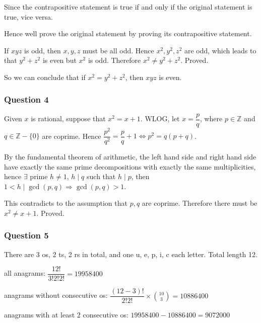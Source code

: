 \documentclass[
]{article}
\begin{document}
Since the contrapositive statement is true if and only if the original
statement is true, vice versa.

Hence we\textquotesingle ll prove the original statement by proving its
contrapositive statement.

If \(xyz\) is odd, then \(x,y,z\) must be all odd. Hence \(x^2,y^2,z^2\)
are odd, which leads to that \(y^2+z^2\) is even but \(x^2\) is odd.
Therefore \(x^2\neq y^2+z^2\). Proved.

So we can conclude that if \(x^2=y^2+z^2\), then \(xyz\) is even.

\hypertarget{question-4}{%
\subsubsection{Question 4}\label{question-4}}

Given \(x\) is rational, suppose that \(x^2=x+1\). WLOG, let
\(x=\dfrac{p}{q}\), where \(p\in \mathbb{Z}\) and
\(q\in \mathbb{Z}-\{0\}\) are coprime. Hence
\(\dfrac{p^2}{q^2}=\dfrac{p}{q}+1\Leftrightarrow p^2=q(p+q)\).

By the fundamental theorem of arithmetic, the left hand side and right
hand side have exactly the same prime decompositions with exactly the
same multiplicities, hence \(\exists\) prime \(h\neq 1\), \(h\mid q\)
such that \(h\mid p\), then
\(1<h\mid \gcd (p,q)\Rightarrow \gcd(p,q) >1\).

This contradicts to the assumption that \(p,q\) are coprime. Therefore
there must be \(x^2\neq x+1\). Proved.

\hypertarget{question-5}{%
\subsubsection{Question 5}\label{question-5}}

There are 3 o\textquotesingle s, 2 t\textquotesingle s, 2
r\textquotesingle s in total, and one u, e, p, i, c each letter. Total
length 12.

all anagrams: \(\dfrac{12!}{3!2!2!}=19958400\)

anagrams without consecutive o\textquotesingle s:
\(\displaystyle \dfrac{(12-3)!}{2!2!}\times \binom{10}{3}=10886400\)

anagrams with at least 2 consecutive o\textquotesingle s:
\(19958400-10886400=9072000\)
\end{document}
